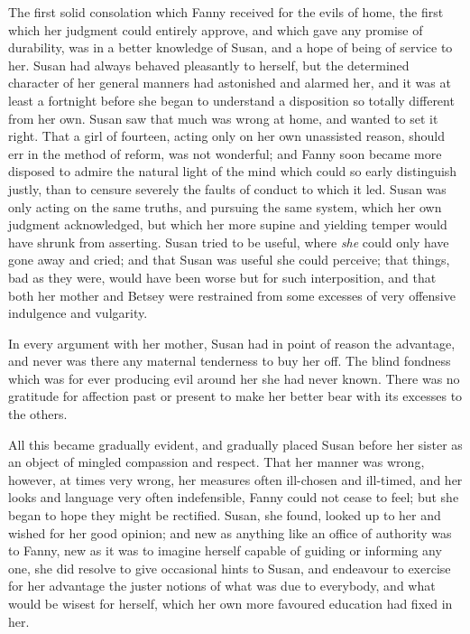 The first solid consolation which Fanny received for
the evils of home, the first which her judgment could
entirely approve, and which gave any promise of durability,
was in a better knowledge of Susan, and a hope of being
of service to her.  Susan had always behaved pleasantly
to herself, but the determined character of her general
manners had astonished and alarmed her, and it was at least
a fortnight before she began to understand a disposition
so totally different from her own.  Susan saw that much
was wrong at home, and wanted to set it right.  That a girl
of fourteen, acting only on her own unassisted reason,
should err in the method of reform, was not wonderful;
and Fanny soon became more disposed to admire the natural
light of the mind which could so early distinguish justly,
than to censure severely the faults of conduct to which it led.
Susan was only acting on the same truths, and pursuing
the same system, which her own judgment acknowledged,
but which her more supine and yielding temper would
have shrunk from asserting.  Susan tried to be useful,
where \emph{she} could only have gone away and cried; and that
Susan was useful she could perceive; that things, bad as
they were, would have been worse but for such interposition,
and that both her mother and Betsey were restrained from
some excesses of very offensive indulgence and vulgarity.

In every argument with her mother, Susan had in point
of reason the advantage, and never was there any maternal
tenderness to buy her off.  The blind fondness which was
for ever producing evil around her she had never known.
There was no gratitude for affection past or present
to make her better bear with its excesses to the others.

All this became gradually evident, and gradually placed
Susan before her sister as an object of mingled compassion
and respect.  That her manner was wrong, however, at times
very wrong, her measures often ill-chosen and ill-timed,
and her looks and language very often indefensible,
Fanny could not cease to feel; but she began to hope they
might be rectified.  Susan, she found, looked up to her
and wished for her good opinion; and new as anything like an
office of authority was to Fanny, new as it was to imagine
herself capable of guiding or informing any one, she did
resolve to give occasional hints to Susan, and endeavour
to exercise for her advantage the juster notions of what was
due to everybody, and what would be wisest for herself,
which her own more favoured education had fixed in her.

